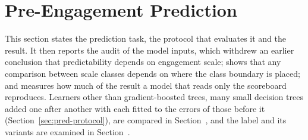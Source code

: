 
\section{Pre-Engagement Prediction}\label{sec:prediction}

This section states the prediction task, the protocol that evaluates it and the result. It then reports
the audit of the model inputs, which withdrew an earlier conclusion that predictability depends on
engagement scale; shows that any comparison between scale classes depends on where the class boundary
is placed; and measures how much of the result a model that reads only the scoreboard reproduces.
Learners other than gradient-boosted trees, many small decision trees added one after another with each
fitted to the errors of those before it (Section~\ref{sec:pred-protocol}), are compared in
Section~, and the label
and its variants are examined in Section~.

